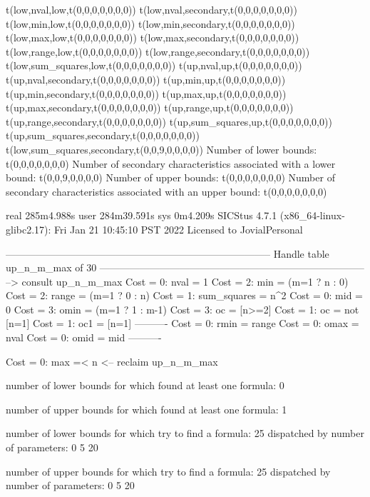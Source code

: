 t(low,nval,low,t(0,0,0,0,0,0,0))
t(low,nval,secondary,t(0,0,0,0,0,0,0))
t(low,min,low,t(0,0,0,0,0,0,0))
t(low,min,secondary,t(0,0,0,0,0,0,0))
t(low,max,low,t(0,0,0,0,0,0,0))
t(low,max,secondary,t(0,0,0,0,0,0,0))
t(low,range,low,t(0,0,0,0,0,0,0))
t(low,range,secondary,t(0,0,0,0,0,0,0))
t(low,sum_squares,low,t(0,0,0,0,0,0,0))
t(up,nval,up,t(0,0,0,0,0,0,0))
t(up,nval,secondary,t(0,0,0,0,0,0,0))
t(up,min,up,t(0,0,0,0,0,0,0))
t(up,min,secondary,t(0,0,0,0,0,0,0))
t(up,max,up,t(0,0,0,0,0,0,0))
t(up,max,secondary,t(0,0,0,0,0,0,0))
t(up,range,up,t(0,0,0,0,0,0,0))
t(up,range,secondary,t(0,0,0,0,0,0,0))
t(up,sum_squares,up,t(0,0,0,0,0,0,0))
t(up,sum_squares,secondary,t(0,0,0,0,0,0,0))
t(low,sum_squares,secondary,t(0,0,9,0,0,0,0))
Number of lower bounds:                                             t(0,0,0,0,0,0,0)
Number of secondary characteristics associated with a lower bound:  t(0,0,9,0,0,0,0)
Number of upper bounds:                                             t(0,0,0,0,0,0,0)
Number of secondary characteristics associated with an upper bound: t(0,0,0,0,0,0,0)

real	285m4.988s
user	284m39.591s
sys	0m4.209s
SICStus 4.7.1 (x86_64-linux-glibc2.17): Fri Jan 21 10:45:10 PST 2022
Licensed to JovialPersonal


--------------------------------------------------------------------------------
Handle table up_n_m_max of 30
--------------------------------------------------------------------------------
--> consult up_n_m_max
Cost =  0:  nval        = 1
Cost =  2:  min         = (m=1 ? n : 0)
Cost =  2:  range       = (m=1 ? 0 : n)
Cost =  1:  sum_squares = n^2
Cost =  0:  mid         = 0
Cost =  3:  omin        = (m=1 ? 1 : m-1)
Cost =  3:  oc          = [n>=2]
Cost =  1:  oc          = not [n=1]
Cost =  1:  oc1         = [n=1]
----------
Cost =  0:  rmin        = range
Cost =  0:  omax        = nval
Cost =  0:  omid        = mid
----------

Cost =  0:  max =< n
<-- reclaim up_n_m_max

number of lower bounds for which found at least one formula: 0

number of upper bounds for which found at least one formula: 1

number of lower bounds for which try to find a formula: 25
dispatched by number of parameters: 0  5  20

number of upper bounds for which try to find a formula: 25
dispatched by number of parameters: 0  5  20

